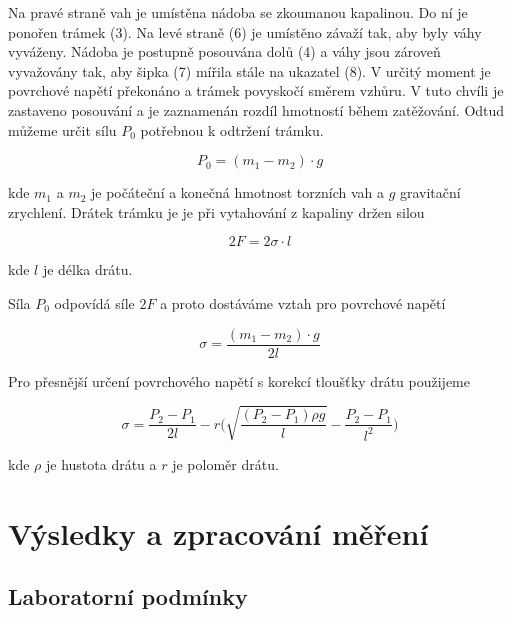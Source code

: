 Na pravé straně vah je umístěna nádoba se zkoumanou kapalinou. Do ní je ponořen trámek (3). Na levé straně (6) je umístěno závaží tak, aby byly váhy vyváženy. Nádoba je postupně posouvána dolů (4) a váhy jsou zároveň vyvažovány tak, aby šipka (7) mířila stále na ukazatel (8). V určitý moment je povrchové napětí překonáno a trámek povyskočí směrem vzhůru. V tuto chvíli je zastaveno posouvání a je zaznamenán rozdíl hmotností během zatěžování. Odtud můžeme určit sílu \(P_0\) potřebnou k odtržení trámku.

\begin{equation}
    P_0 = (m_1 - m_2) \cdot g
\end{equation}

kde \(m_1\) a \(m_2\) je počáteční a konečná hmotnost torzních vah a \(g\) gravitační zrychlení. Drátek trámku je je při vytahování z kapaliny držen silou

\begin{equation}
    2F = 2 \sigma \cdot l
\end{equation}

kde \(l\) je délka drátu.

Síla \(P_0\) odpovídá síle \(2F\) a proto dostáváme vztah pro povrchové napětí

\begin{equation}
    \sigma = \frac{(m_1 - m_2)\cdot g}{2l}
\end{equation}

Pro přesnější určení povrchového napětí s korekcí tloušťky drátu použijeme

\begin{equation}
    \sigma = \frac{P_2 - P_1}{2l}-r\Bigg(\sqrt{\frac{(P_2 - P_1)\rho g}{l}}-\frac{P_2 - P_1}{l^2} \Bigg)
\end{equation}

kde \(\rho\) je hustota drátu a \(r\) je poloměr drátu.

\section{Výsledky a zpracování měření}

\subsection{Laboratorní podmínky}

